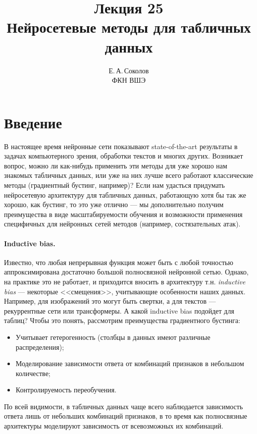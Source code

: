 \documentclass[12pt,fleqn]{article}
\begin{document}
\title{Лекция 25 \\ Нейросетевые методы для табличных данных}
\author{Е.\,А.\,Соколов \\ ФКН ВШЭ}
\date{}
\maketitle

\section{Введение}
В настоящее время нейронные сети показывают state-of-the-art результаты в задачах компьютерного зрения, обработки текстов и многих других. Возникает вопрос, можно ли как-нибудь применить эти методы для уже хорошо нам знакомых табличных данных, или уже на них лучше всего работают классические методы (градиентный бустинг, например)? Если нам удасться придумать нейросетевую архитектуру для табличных данных, работающую хотя бы так же хорошо, как бустинг, то это уже отлично --- мы дополнительно получим преимущества в виде масштабируемости обучения и возможности применения специфичных для нейронных сетей методов (например, состязательных атак).

\paragraph{Inductive bias.} Известно, что любая непрерывная функция может быть с любой точностью аппроксимирована достаточно большой полносвязной нейронной сетью. Однако, на практике это не работает, и приходится вносить в архитектуру т.н. \textit{inductive bias} --- некоторые <<смещения>>, учитывающие особенности наших данных. Например, для изображений это могут быть свертки, а для текстов --- рекуррентные сети или трансформеры. А какой inductive bias подойдет для таблиц? Чтобы это понять, рассмотрим преимущества градиентного бустинга:
\begin{itemize}
	\item Учитывает гетерогенность (столбцы в данных имеют различные распределения);
	\item Моделирование зависимости ответа от комбинаций признаков в небольшом количестве;
	\item Контролируемость переобучения.
\end{itemize}
По всей видимости, в табличных данных чаще всего наблюдается зависимость ответа лишь от небольших комбинаций признаков, в то время как полносвязные архитектуры моделируют зависимость от всевозможных их комбинаций.
\end{document}
